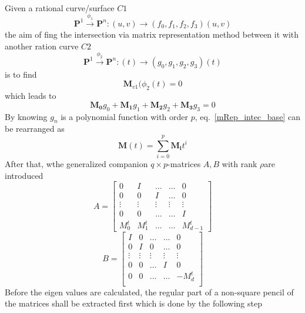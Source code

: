 \paragraph{} 
Given a rational curve/surface $C1$
\begin{equation*}
	\mathbf{P}^1 \xrightarrow{\phi_1} \mathbf{P}^n: (u,v) \rightarrow(f_0,f_1,f_2,f_3)(u,v)
\end{equation*}
the aim of fing the intersection via matrix representation method between it with another ration curve $C2$
\begin{equation}
	\mathbf{P}^1 \xrightarrow{\phi_2} \mathbf{P}^n: (t) \rightarrow(g_0,g_1,g_2,g_3)(t)
\end{equation}
is to find
\begin{equation*}
	\mathbf{M}_{v1}(\phi_2(t) = 0
\end{equation*}
which leads to
\begin{equation}
	\mathbf{M_0}g_0 + \mathbf{M_1}g_1 + \mathbf{M_2}g_2 + \mathbf{M_3}g_3 = 0
	\label{mRep_intec_base}
\end{equation}
By knowing $g_n$ is a polynomial function with order $p$, eq.~\eqref{mRep_intec_base} can be rearranged as
\begin{equation*}
	\mathbf{M}(t) = \sum_{i=0}^p \mathbf{M_i}t^i
\end{equation*}
After that, wthe generalized companion $q\times p$-matrices $A,B$ with rank $\rho$are introduced
\begin{equation*}
	A = 
	\begin{bmatrix}
		0		&I 		&\dots 		&\dots 		&0 		\\
		0 		&0 		&I 			&\dots 		&0 		\\
		\vdots 	&\vdots &\vdots 	&\vdots 	&\vdots \\
		0 		&0 		&\dots		&\dots 		&I 		\\
		M_0^t 	&M_1^t 	&\dots 		&\dots 		&M_{d-1}^t
	\end{bmatrix}
\end{equation*}
\begin{equation*}
	B = 
	\begin{bmatrix}
		I 		&0 		&\dots 		&\dots 		&0 		\\
		0 		&I 		&0 			&\dots 		&0 		\\
		\vdots 	&\vdots &\vdots 	&\vdots 	&\vdots \\
		0 		&0 		&\dots 		&I 			&0 		\\
		0 		&0 		&\dots 		&\dots 		&-M_d^t \\		
	\end{bmatrix}
\end{equation*}
Before the eigen values are calculated, the regular part of a non-square pencil of the matrices shall be extracted first which is done by the following step
